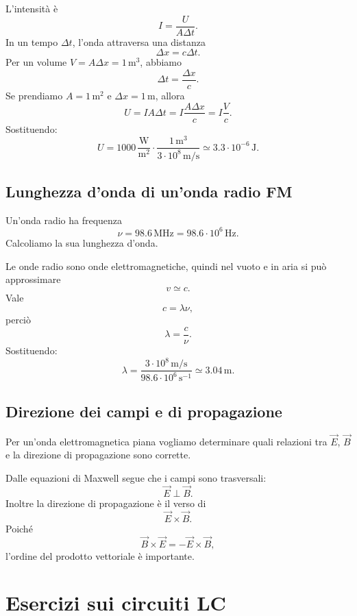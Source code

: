 \documentclass[a4paper]{article}
\begin{document}
\begin{snippetsolution}{}
L'intensità è
\[
    I=\frac{U}{A\Delta t}.
\]
In un tempo \(\Delta t\), l'onda attraversa una distanza
\[
    \Delta x=c\Delta t.
\]
Per un volume \(V=A\Delta x=1\,\mathrm{m}^3\), abbiamo
\[
    \Delta t=\frac{\Delta x}{c}.
\]
Se prendiamo \(A=1\,\mathrm{m}^2\) e \(\Delta x=1\,\mathrm{m}\), allora
\[
    U=IA\Delta t=I\frac{A\Delta x}{c}=I\frac{V}{c}.
\]
Sostituendo:
\[
    U=1000\,\frac{\mathrm{W}}{\mathrm{m}^2}\cdot\frac{1\,\mathrm{m}^3}{3\cdot 10^8\,\mathrm{m/s}}
    \simeq 3.3\cdot 10^{-6}\,\mathrm{J}.
\]
\end{snippetsolution}

\subsection{Lunghezza d'onda di un'onda radio FM}

Un'onda radio ha frequenza
\[
\nu=98.6\,\mathrm{MHz}=98.6\cdot 10^6\,\mathrm{Hz}.
\]
Calcoliamo la sua lunghezza d'onda.

\begin{snippetsolution}{}
Le onde radio sono onde elettromagnetiche, quindi nel vuoto e in aria si può approssimare
\[
    v\simeq c.
\]
Vale
\[
    c=\lambda\nu,
\]
perciò
\[
    \lambda=\frac{c}{\nu}.
\]
Sostituendo:
\[
    \lambda=\frac{3\cdot 10^8\,\mathrm{m/s}}{98.6\cdot 10^6\,\mathrm{s}^{-1}}
    \simeq 3.04\,\mathrm{m}.
\]
\end{snippetsolution}

\subsection{Direzione dei campi e di propagazione}

Per un'onda elettromagnetica piana vogliamo determinare quali relazioni tra \(\vec{E}\), \(\vec{B}\) e la direzione di propagazione sono corrette.

\begin{snippetsolution}{}
Dalle equazioni di Maxwell segue che i campi sono trasversali:
\[
    \vec{E}\perp\vec{B}.
\]
Inoltre la direzione di propagazione è il verso di
\[
    \vec{E}\times\vec{B}.
\]
Poiché
\[
    \vec{B}\times\vec{E}=-\vec{E}\times\vec{B},
\]
l'ordine del prodotto vettoriale è importante.
\end{snippetsolution}

\section{Esercizi sui circuiti LC}
\end{document}
